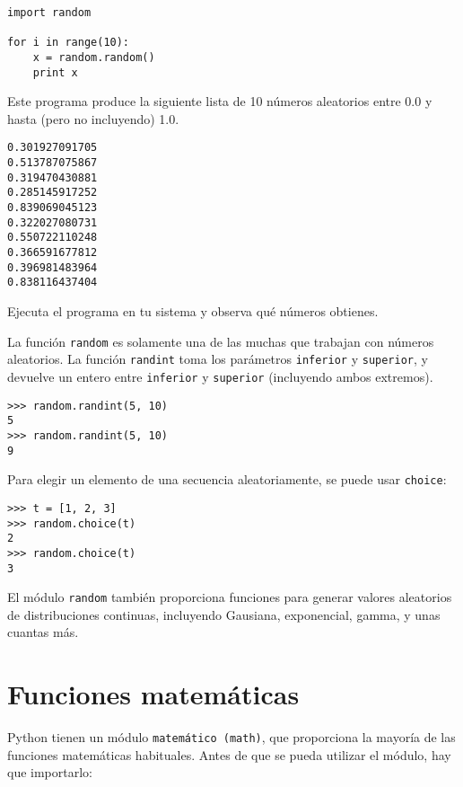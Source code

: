 \beforeverb
\begin{verbatim}
import random

for i in range(10):
    x = random.random()
    print x
\end{verbatim}
\afterverb
%
Este programa produce la siguiente lista de 10 números aleatorios
entre 0.0 y hasta (pero no incluyendo) 1.0.

\beforeverb
\begin{verbatim}
0.301927091705
0.513787075867
0.319470430881
0.285145917252
0.839069045123
0.322027080731
0.550722110248
0.366591677812
0.396981483964
0.838116437404
\end{verbatim}
\afterverb
%
\begin{ex}
Ejecuta el programa en tu sistema y observa qué números obtienes.
\end{ex}

La función {\tt random} es solamente una de las muchas
que trabajan con números aleatorios.
La función {\tt randint} toma los parámetros {\tt inferior} y
{\tt superior}, y devuelve un entero entre {\tt inferior} y 
{\tt superior} (incluyendo ambos extremos).


\beforeverb
\begin{verbatim}
>>> random.randint(5, 10)
5
>>> random.randint(5, 10)
9
\end{verbatim}
\afterverb
%
Para elegir un elemento de una secuencia aleatoriamente, se puede usar
{\tt choice}:


\beforeverb
\begin{verbatim}
>>> t = [1, 2, 3]
>>> random.choice(t)
2
>>> random.choice(t)
3
\end{verbatim}
\afterverb
%
El módulo {\tt random} también proporciona funciones para generar
valores aleatorios de distribuciones continuas, incluyendo
Gausiana, exponencial, gamma, y unas cuantas más.

\section{Funciones matemáticas}

Python tienen un módulo {\tt matemático (math)}, que proporciona la mayoría
de las funciones matemáticas habituales.
Antes de que se pueda utilizar el módulo, hay que importarlo:

